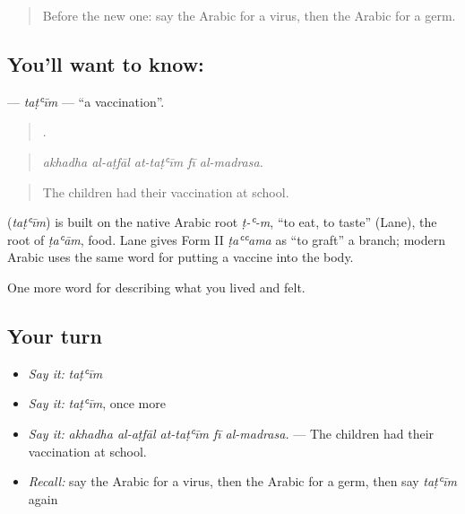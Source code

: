 \label{lesson:AR-C509-tatim}



\begin{quote}
Before the new one: say the Arabic for a virus, then the Arabic for a germ.
\end{quote}

\subsection*{You'll want to know: }
\textbf{} — \emph{taṭʿīm} — \textquotedblleft{}a vaccination\textquotedblright{}.

\begin{quote}
    .
\end{quote}

\begin{quote}
\emph{akhadha al-aṭfāl at-taṭʿīm fī al-madrasa.}
\end{quote}

\begin{quote}
The children had their vaccination at school.
\end{quote}

\begin{cousinweb}
\textbf{} (\emph{taṭʿīm}) is built on the native Arabic root \emph{ṭ-ʿ-m}, \textquotedblleft{}to eat, to taste\textquotedblright{} (Lane), the root of \emph{ṭaʿām}, food. Lane gives Form II \emph{ṭaʿʿama} as \textquotedblleft{}to graft\textquotedblright{} a branch; modern Arabic uses the same word for putting a vaccine into the body.
\end{cousinweb}

\begin{grammarlens}[title={What you've built}]
One more word for describing what you lived and felt.
\end{grammarlens}

\subsection*{Your turn}
\begin{itemize}
\raggedright
  \item \emph{Say it:} \emph{taṭʿīm}
  \item \emph{Say it:} \emph{taṭʿīm}, once more
  \item \emph{Say it:} \emph{akhadha al-aṭfāl at-taṭʿīm fī al-madrasa.} — The children had their vaccination at school.
  \item \emph{Recall:} say the Arabic for a virus, then the Arabic for a germ, then say \emph{taṭʿīm} again
\end{itemize}

